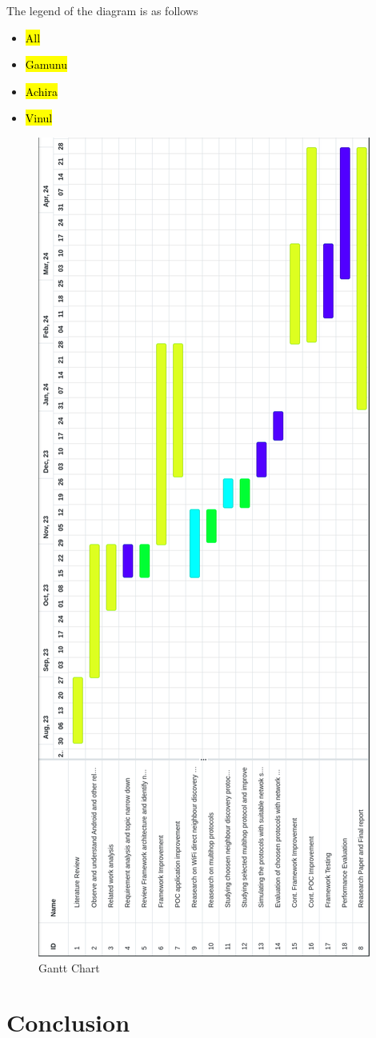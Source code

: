 \documentclass[12pt, conference, onecolumn, a4paper]{IEEEtran}
\begin{document}
The legend of the diagram is as follows
\begin{itemize}
    \item \hl{All}
    \item \hl{Gamunu}
    \item \hl{Achira}
    \item \hl{Vinul}
\end{itemize}

\begin{figure}[htbp]
    \centerline{\includegraphics[height=1.4\textwidth]{imgs/gantt.png}}
    \caption{Gantt Chart}
    \label{gantt}
\end{figure}

\newpage
\newpage

\section{Conclusion}
\end{document}

